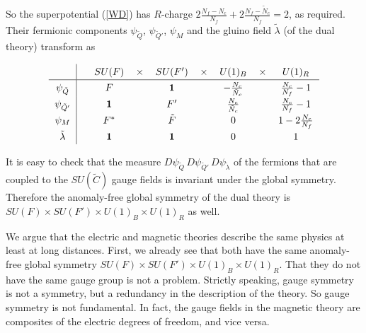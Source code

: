 \documentclass[lecture]{qft-l}
\newcommand{\lam}{\lambda}
\newcommand{\one}{\mathbf{1}}
\newcommand{\FT}{F'}%
\newcommand{\CD}{\tilde{C}}
\newcommand{\ND}{\tilde{N}_c}
\newcommand{\FD}{\tilde{F}}
\newcommand{\QD}{\tilde{Q}}
\newcommand{\QDT}{\tilde{Q}'}
\newcommand{\lamD}{\tilde{\lam}}
\newcommand{\GLOBAL}{SU(F)\times SU(\FT)\times U(1)_B\times U(1)_R}
\numberwithin{figure}{chapter}
\begin{document}
\bigskip\noindent
So the superpotential (\ref{WD}) has $R$-charge
$2\frac{N_f-N_c}{N_f}+2\frac{N_f-\ND}{N_f}=2$, as required.
Their fermionic components $\psi_{\QD}$, $\psi_{\QDT}$, $\psi_M$
and the gluino field $\lamD$ (of the dual theory) transform as

\bigskip
\begin{equation}
\renewcommand{\arraystretch}{1.3}
\begin{tabular}{c|cccccccc}\label{magtran}
&&    $SU(F)$	&$\times$&  $SU(\FT)$	&$\times$&    $U(1)_B$
&$\times$&     $U(1)_R$						\\
					\hline
$\psi_{\QD}$&&  $F$ &&  $\one$	&	& $-\frac{N_c}{\ND}$
&	&     $\frac{N_c}{N_f}-1$				\\
$\psi_{\QDT}$&& $\one$	&&   $\FT$&	& $\frac{N_c}{\ND}$
&	&     $\frac{N_c}{N_f}-1$				\\
$\psi_M$&& 	$F^*$	&	&  $\FD$	&	&   $0$
&	&     $1-2\frac{N_c}{N_f}$				\\
$\lamD$	&&    $\one$	&	&   $\one$	&	&    $0$
&	&      $1$
\end{tabular}
\end{equation}

\bigskip\noindent
It is easy to 
check that the measure $D\psi_{\QD}\,D\psi_{\QDT}\,D\psi_{\lamD}$
of the fermions that are coupled to the $SU(\CD)$ gauge fields is invariant 
under the global symmetry.
Therefore the anomaly-free global symmetry of the dual theory is $\GLOBAL$
as well.

We argue that the electric and magnetic theories describe the same physics
at least at long distances.
First, we already see that both have the same anomaly-free global symmetry 
$\GLOBAL$.
That they do not have the same gauge group is not a problem.
Strictly speaking, gauge symmetry is not a symmetry, but a redundancy
in the description of the theory.
So gauge symmetry is not fundamental.
In fact, the gauge fields in the magnetic theory are composites of
the electric degrees of freedom, and vice versa.
\end{document}
